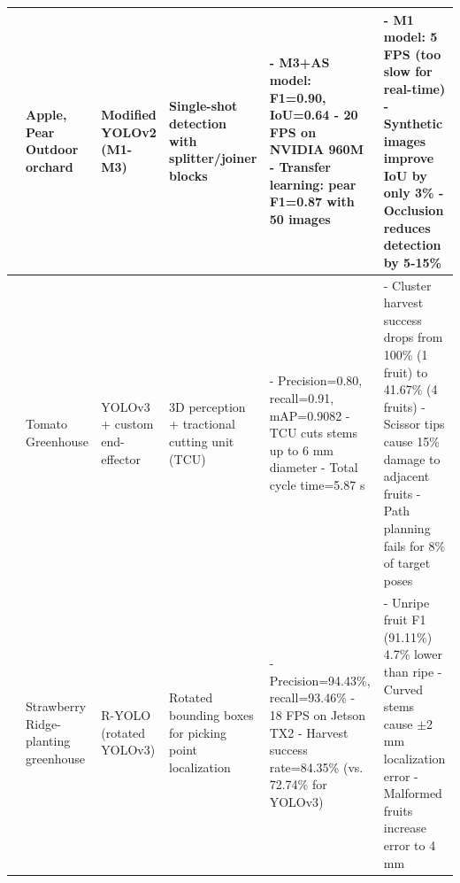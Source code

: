 \documentclass[pdflatex,sn-mathphys-num]{sn-jnl}
\begin{document}
\begin{table}[htbp]
\begin{tabular}{p{1cm}p{1.2cm}p{1cm}p{2cm}p{2.5cm}p{2.8cm}}
	\cite{bresilla2019single} \newline 2019 & Apple, Pear \newline Outdoor orchard & Modified YOLOv2 (M1-M3) & Single-shot detection with splitter/joiner blocks & - M3+AS model: F1=0.90, IoU=0.64 \newline - 20 FPS on NVIDIA 960M \newline - Transfer learning: pear F1=0.87 with 50 images & - M1 model: 5 FPS (too slow for real-time) \newline - Synthetic images improve IoU by only 3\% \newline - Occlusion reduces detection by 5-15\% \\ \midrule
	\cite{jun2021towards} \newline 2021 & Tomato \newline Greenhouse & YOLOv3 + custom end-effector & 3D perception + tractional cutting unit (TCU) & - Precision=0.80, recall=0.91, mAP=0.9082 \newline - TCU cuts stems up to 6 mm diameter \newline - Total cycle time=5.87 s & - Cluster harvest success drops from 100\% (1 fruit) to 41.67\% (4 fruits) \newline - Scissor tips cause 15\% damage to adjacent fruits \newline - Path planning fails for 8\% of target poses \\ \midrule
	\cite{yu2020real} \newline 2020 & Strawberry \newline Ridge-planting greenhouse & R-YOLO (rotated YOLOv3) & Rotated bounding boxes for picking point localization & - Precision=94.43\%, recall=93.46\% \newline - 18 FPS on Jetson TX2 \newline - Harvest success rate=84.35\% (vs. 72.74\% for YOLOv3) & - Unripe fruit F1 (91.11\%) 4.7\% lower than ripe \newline - Curved stems cause $\pm$2 mm localization error \newline - Malformed fruits increase error to 4 mm \\ \midrule

	\end{tabular}
\end{table}
\end{document}

